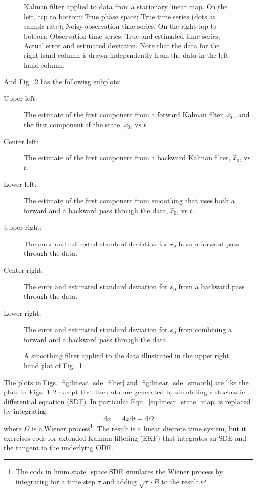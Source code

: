 \documentclass[12pt]{article}
\newcommand{\diff}{\text{d}}
\newcommand{\filterplot}[2]{
\begin{figure}
  \centering
  \resizebox{0.7\textwidth}{!}{\texttt{[image: \#1.pdf]}}
  \caption{#2}
  \label{fig:#1}
\end{figure}
}
\begin{document}
%
\filterplot{linear_map_filter}{Kalman filter applied to data from a
  stationary linear map.  On the left, top to bottom: True phase
  space; True time series (dots at sample rate); Noisy observation
  time series.  On the right top to bottom: Observation time series;
  True and estimated time series; Actual error and estimated
  deviation.  Note that the data for the right hand column is drawn
  independently from the data in the left hand column.}
%
\pagebreak %
And Fig.~\ref{fig:linear_map_smooth} has the following subplots:
\begin{description}
\item[Upper left:] The estimate of the first component from a forward
  Kalman filter, $\hat x_0$, and the first component of the state,
  $x_0$, vs $t$.
\item[Center left:] The estimate of the first component from a backward
  Kalman filter, $\hat x_0$, vs $t$.
\item[Lower left:] The estimate of the first component from smoothing
  that uses both a forward and a backward pass through the data,
  $\hat x_0$, vs $t$.
\item[Upper right:] The error and estimated standard deviation for
  $x_0$ from a forward pass through the data.
\item[Center right:] The error and estimated standard deviation for
  $x_0$ from a backward pass through the data.
\item[Lower right:] The error and estimated standard deviation for
  $x_0$ from combining a forward and a backward pass through the data.
\end{description}

\filterplot{linear_map_smooth}{A smoothing filter applied to the data
  illustrated in the upper right hand plot of Fig.~\ref{fig:linear_map_filter} }%
\pagebreak

The plots in Figs. \ref{fig:linear_sde_filter} and
\ref{fig:linear_sde_smooth} are like the plots in
Figs.~\ref{fig:linear_map_filter} \ref{fig:linear_map_smooth} except
that the data are generated by simulating a stochastic differential
equation (SDE).  In particular Eqn.~\eqref{eq:linear_state_map} is
replaced by integrating
\begin{equation}
  \label{eq:linear_state_sde}
  \diff x = A x \diff t + \diff \Omega
\end{equation}
where $\Omega$ is a Wiener process\footnote{The code in
  hmm.state\_space.SDE simulates the Wiener process by integrating for
  a time step $\tau$ and adding $\sqrt{\tau}\cdot B$ to the result.}.
The result is a linear discrete time system, but it exercises code for
extended Kalman filtering (EKF) that integrates an SDE and the tangent
to the underlying ODE.
\end{document}
